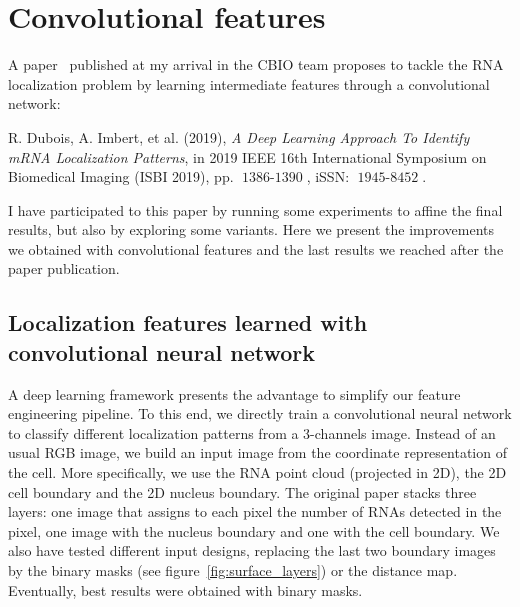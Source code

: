 
\graphicspath{{../../figures/appendix/}}

\chapter{Convolutional features}
\label{ch:convolutional_features}

\newpage

A paper~\cite{dubois_deep_2019} published at my arrival in the CBIO team proposes to tackle the \ac{RNA} localization problem by learning intermediate features through a convolutional network:

\begin{center}
	\color{green}
	R. Dubois, A. Imbert, et al. (2019), \textit{A Deep Learning Approach To Identify mRNA Localization Patterns}, in 2019 IEEE 16th International Symposium on Biomedical Imaging (ISBI 2019), pp. $\operatorname{1386-1390}$, iSSN: $\operatorname{1945-8452}$.
\end{center}

\noindent
I have participated to this paper by running some experiments to affine the final results, but also by exploring some variants.
Here we present the improvements we obtained with convolutional features and the last results we reached after the paper publication.

\section{Localization features learned with convolutional neural network}
\label{sec:learn_cnn_features}

A deep learning framework presents the advantage to simplify our feature engineering pipeline.
To this end, we directly train a convolutional neural network to classify different localization patterns from a 3-channels image.
Instead of an usual RGB image, we build an input image from the coordinate representation of the cell.
More specifically, we use the \ac{RNA} point cloud (projected in 2D), the 2D cell boundary and the 2D nucleus boundary.
The original paper stacks three layers: one image that assigns to each pixel the number of \ac{RNA}s detected in the pixel, one image with the nucleus boundary and one with the cell boundary.
We also have tested different input designs, replacing the last two boundary images by the binary masks (see figure~\ref{fig:surface_layers}) or the distance map.
Eventually, best results were obtained with binary masks.

